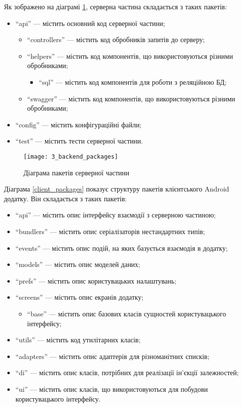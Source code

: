 \documentclass[../main.tex]{subfiles}
\begin{document}
Як зображено на діаграмі \ref{server_packages}, серверна частина складається з таких пакетів:
\begin{itemize}
	\item \enquote{api} — містить основний код серверної частини;
	\begin{itemize}
		\item \enquote{controllers} — містить код обробників запитів до серверу;
		\item \enquote{helpers} — містить код компонентів, що використовуються різними обробниками;
		\begin{itemize}
			\item \enquote{sql} — містить код компонентів для роботи з реляційною БД;
		\end{itemize}
		\item \enquote{swagger} — містить код компонентів, що використовуються різними обробниками;
	\end{itemize}
	\item \enquote{config} — містить конфігураційні файли;
	\item \enquote{test} — містить тести серверної частини.
\end{itemize}

\begin{figure}[H]
	\centering
	\texttt{[image: 3\_backend\_packages]}
	\caption{Діаграма пакетів серверної частини}
	\label{server_packages}
\end{figure}


Діаграма \ref{client_packages} показує структуру пакетів клієнтського Android додатку. Він складається з таких пакетів:
\begin{itemize}
	\item \enquote{api} — містить опис інтерфейсу взаємодії з серверною частиною;
	\item \enquote{bundlers} — містить опис серіалізаторів нестандартних типів;
	\item \enquote{events} — містить опис подій, на яких базується взаємодія в додатку;
	\item \enquote{models} — містить опис моделей даних;
	\item \enquote{prefs} — містить опис користувацьких налаштувань;
	\item \enquote{screens} — містить опис екранів додатку;
	\begin{itemize}
		\item \enquote{base} — містить опис базових класів сущностей користувацького інтерфейсу;
	\end{itemize}
	\item \enquote{utils} — містить код утилітарних класів;
	\item \enquote{adapters} — містить опис адаптерів для різноманітних списків;
	\item \enquote{di} — містить опис класів, потрібних для реалізації ін'єкції залежностей;
	\item \enquote{ui} — містить опис класів, що використовуються для побудови користувацького інтерфейсу.
\end{itemize}
\end{document}
